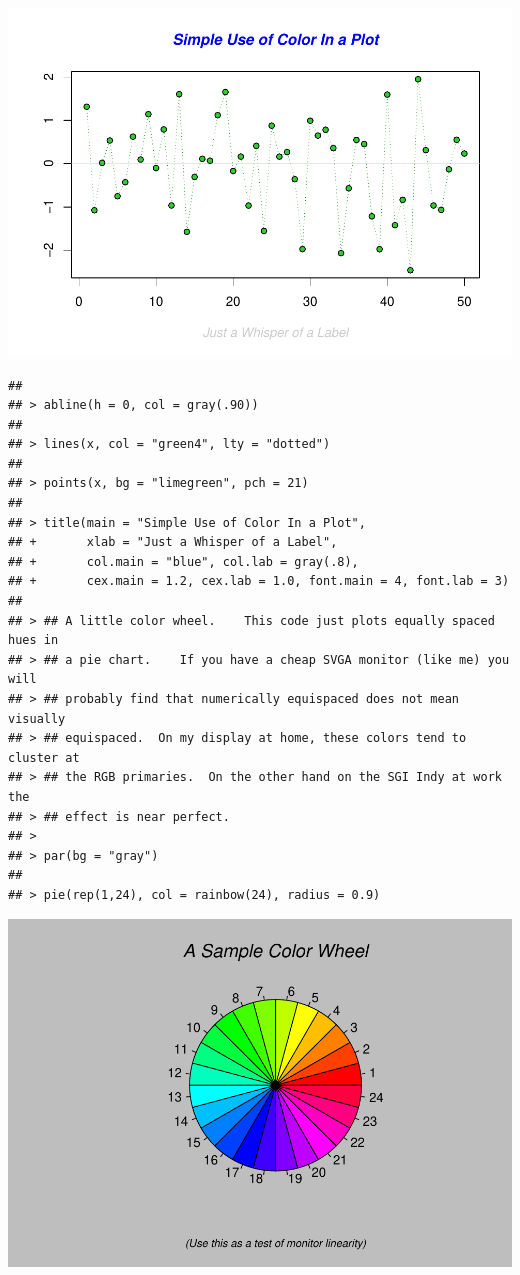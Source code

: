 \documentclass[
]{book}
\begin{document}
\includegraphics{bookdown-demo_files/figure-latex/unnamed-chunk-6-1.pdf}

\begin{verbatim}
## 
## > abline(h = 0, col = gray(.90))
## 
## > lines(x, col = "green4", lty = "dotted")
## 
## > points(x, bg = "limegreen", pch = 21)
## 
## > title(main = "Simple Use of Color In a Plot",
## +       xlab = "Just a Whisper of a Label",
## +       col.main = "blue", col.lab = gray(.8),
## +       cex.main = 1.2, cex.lab = 1.0, font.main = 4, font.lab = 3)
## 
## > ## A little color wheel.    This code just plots equally spaced hues in
## > ## a pie chart.    If you have a cheap SVGA monitor (like me) you will
## > ## probably find that numerically equispaced does not mean visually
## > ## equispaced.  On my display at home, these colors tend to cluster at
## > ## the RGB primaries.  On the other hand on the SGI Indy at work the
## > ## effect is near perfect.
## > 
## > par(bg = "gray")
## 
## > pie(rep(1,24), col = rainbow(24), radius = 0.9)
\end{verbatim}

\includegraphics{bookdown-demo_files/figure-latex/unnamed-chunk-6-2.pdf}
\end{document}
